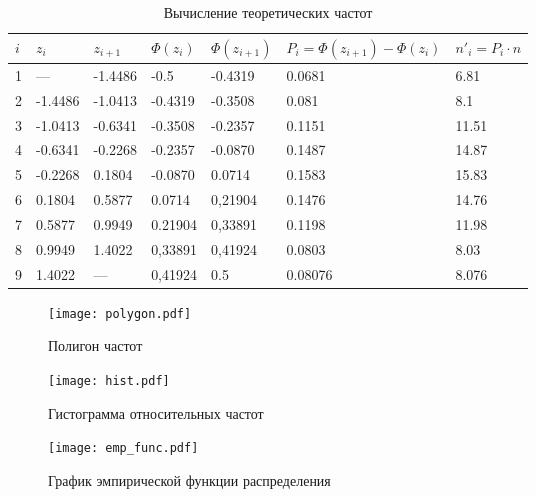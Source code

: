 \documentclass{article}
\theoremstyle{problemstyle}
\begin{document}
\begin{table}[ht!]
  \centering
  \begin{tabular}{|l||l|l||l|l||l|l|}
    \hline
    \(i\) & \(z_i\) & \(z_{i+1}\) & 
    \(\Phi(z_i)\) & \(\Phi(z_{i+1})\) &
    \(P_i = \Phi(z_{i+1}) - \Phi(z_i)\) &
    \(n'_i = P_i \cdot n\)
    \\
    \hline
    1 & ---     & -1.4486 & -0.5    & -0.4319 & 0.0681 & 6.81 \\
    \hline
    2 & -1.4486 & -1.0413 & -0.4319 & -0.3508 & 0.081 & 8.1 \\
    \hline
    3 & -1.0413 & -0.6341 & -0.3508 & -0.2357 & 0.1151 & 11.51 \\
    \hline
    4 & -0.6341 & -0.2268 & -0.2357 & -0.0870 & 0.1487 & 14.87 \\
    \hline
    5 & -0.2268 & 0.1804  & -0.0870 & 0.0714  & 0.1583 & 15.83 \\
    \hline
    6 & 0.1804  & 0.5877  & 0.0714  & 0,21904 & 0.1476 & 14.76 \\
    \hline
    7 & 0.5877  & 0.9949  & 0.21904 & 0,33891 & 0.1198 & 11.98 \\
    \hline
    8 & 0.9949  & 1.4022  & 0,33891 & 0,41924 & 0.0803 & 8.03  \\
    \hline
    9 & 1.4022  & ---     & 0,41924 & 0.5     & 0.08076 & 8.076\\
    \hline
  \end{tabular}
  \caption{Вычисление теоретических частот}\label{table:theoretical_2}
\end{table}





\begin{figure}[ht!]
  \centering
  \texttt{[image: polygon.pdf]}
  \caption{Полигон частот}\label{fig:polygon}
\end{figure}

\begin{figure}[ht!]
  \centering
  \texttt{[image: hist.pdf]}
  \caption{Гистограмма относительных частот}\label{fig:hist}
\end{figure}

\begin{figure}[ht!]
  \centering
  \texttt{[image: emp\_func.pdf]}
  \caption{График эмпирической функции распределения}\label{fig:emp_func}
\end{figure}

\clearpage
\end{document}
